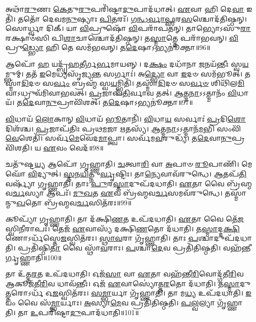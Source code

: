 𑌅𑌥𑌾᳴\-\ul{𑌰𑍁}\-𑌣𑌃 \ul{𑌕𑍇}\-𑌤𑍁\-\ul{𑌰𑍁}\-𑌪𑌰𑌿᳴𑌷𑍍𑌟𑌾\-\ul{𑌦𑍁}\-𑌪𑌾𑌦᳴𑌧𑌾𑌤𑍍। \ul{𑌏}\-𑌵𑌾 𑌹𑌿 𑌦𑍇\-\ul{𑌵𑌾} 𑌇𑌤𑌿᳴। 
𑌤𑌤𑍋᳴ 𑌦𑍇𑌵𑌮\-\ul{𑌨𑍁}\-𑌷𑍍𑌯𑌾𑌃 \ul{𑌪𑌿}\-𑌤𑌰𑌃᳴। \ul{𑌗}\-\-\ul{𑌨𑍍𑌧}\-\-\ul{𑌰𑍍𑌵𑌾}\-\-\ul{𑌫𑍍𑌸}\-𑌰\-\ul{𑌸}\-𑌶𑍍𑌚𑍋𑌦᳴𑌤𑌿𑌷𑍍𑌠𑌨𑍍। 
𑌸𑍋𑌰𑍍𑌧𑍍𑌵𑌾 𑌦𑌿𑌕𑍍। 𑌯𑌾 \ul{𑌵𑌿}\-𑌪𑍍𑌰𑍁𑌷𑍋᳴ \ul{𑌵𑌿}\-𑌪𑌰𑌾᳴𑌪𑌤𑌨𑍍। 
𑌤𑌾𑌭𑍍𑌯𑍋𑌽𑌸𑍁᳴\-\ul{𑌰𑌾} 𑌰𑌕𑍍𑌷𑌾𑍞᳴𑌸𑌿 𑌪𑌿\-\ul{𑌶𑌾}\-𑌚𑌾𑌶𑍍𑌚𑍋𑌦᳴𑌤𑌿𑌷𑍍𑌠𑌨𑍍। 𑌤\-\ul{𑌸𑍍𑌮𑌾}\-𑌤𑍍𑌤𑍇 𑌪𑌰𑌾᳴𑌭𑌵𑌨𑍍। 
\-\ul{𑌵𑌿}\-𑌪𑍍𑌰𑍁\-\ul{𑌡𑍍𑌭𑍍𑌯𑍋} 𑌹𑌿 𑌤𑍇 𑌸𑌮᳴𑌭𑌵𑌨𑍍। 𑌤\-\ul{𑌦𑍇}\-𑌷𑌾𑌽𑌭𑍍𑌯𑌨𑍂॑𑌕𑍍𑌤𑌾॥96॥


𑌆𑌪𑍋᳴ \ul{𑌹} 𑌯𑌦𑍍𑌬𑍃᳴\-\ul{𑌹}\-𑌤𑍀𑌰𑍍𑌗\-\ul{𑌰𑍍𑌭}\-𑌮𑌾𑌯𑌨𑍍𑌨𑍍। 𑌦\-\ul{𑌕𑍍𑌷𑌂} 𑌦𑌧𑌾᳴𑌨𑌾 \ul{𑌜}\-𑌨𑌯᳴𑌨𑍍𑌤𑍀𑌃 𑌸𑍍𑌵\-\ul{𑌯}\-𑌮𑍍𑌭𑍁𑌮𑍍। 
𑌤𑌤᳴ \ul{𑌇}\-𑌮𑍇𑌧𑍍𑌯𑌸𑍃᳴𑌜𑍍𑌯\-\ul{𑌨𑍍𑌤} 𑌸𑌰𑍍𑌗𑌾𑌃॑। 𑌅\-\ul{𑌦𑍍𑌭𑍍𑌯𑍋} 𑌵𑌾 \ul{𑌇}\-𑌦𑍞 𑌸𑌮᳴𑌭𑍂𑌤𑍍। 
𑌤𑌸𑍍𑌮𑌾᳴\-\ul{𑌦𑌿}\-𑌦𑍞 𑌸\-\ul{𑌰𑍍𑌵𑌂} 𑌬𑍍𑌰𑌹𑍍𑌮᳴ 𑌸𑍍𑌵\-\ul{𑌯}\-𑌮𑍍𑌭𑍍𑌵𑌿𑌤𑌿᳴। 
𑌤𑌸𑍍𑌮𑌾᳴\-\ul{𑌦𑌿}\-𑌦𑍞 𑌸\-\ul{𑌰𑍍𑌵}\-\-\ul{𑍞} 𑌶𑌿𑌥𑌿᳴𑌲\-\ul{𑌮𑌿}\-𑌵𑌾𑌽𑌧𑍍𑌰𑍁𑌵᳴𑌮𑌿𑌵𑌾𑌭𑌵𑌤𑍍। 
\-\ul{𑌪𑍍𑌰}\-𑌜𑌾𑌪᳴\-\ul{𑌤𑌿}\-𑌰𑍍𑌵𑌾𑌵 𑌤𑌤𑍍। \ul{𑌆}\-𑌤𑍍𑌮\-\ul{𑌨𑌾}\-𑌽𑌽𑌤𑍍𑌮𑌾𑌨𑌂᳴ \ul{𑌵𑌿}\-𑌧𑌾𑌯᳴। 
𑌤\-\ul{𑌦𑍇}\-𑌵𑌾\-\ul{𑌨𑍁}\-𑌪𑍍𑌰𑌾𑌵𑌿᳴𑌶𑌤𑍍। 𑌤\-\ul{𑌦𑍇}\-𑌷𑌾𑌽𑌭𑍍𑌯𑌨𑍂॑𑌕𑍍𑌤𑌾॥97॥


\-\ul{𑌵𑌿}\-𑌧𑌾𑌯᳴ \ul{𑌲𑍋}\-𑌕𑌾𑌨𑍍‌ \ul{𑌵𑌿}\-𑌧𑌾𑌯᳴ \ul{𑌭𑍂}\-𑌤𑌾𑌨𑌿᳴। \ul{𑌵𑌿}\-𑌧𑌾\-\ul{𑌯} 𑌸𑌰𑍍𑌵𑌾𑌃॑ \ul{𑌪𑍍𑌰}\-𑌦𑌿\-\ul{𑌶𑍋} 𑌦𑌿𑌶᳴𑌶𑍍𑌚। 
\-\ul{𑌪𑍍𑌰}\-𑌜𑌾𑌪᳴𑌤𑌿𑌃 𑌪𑍍𑌰𑌥\-\ul{𑌮}\-𑌜𑌾 \ul{𑌋}\-𑌤𑌸𑍍𑌯᳴। \ul{𑌆}\-𑌤𑍍𑌮\-\ul{𑌨𑌾}\-𑌽𑌽𑌤𑍍𑌮𑌾𑌨᳴\-\ul{𑌮}\-𑌭𑌿 𑌸𑌂𑌵𑌿᳴\-\ul{𑌵𑍇}\-𑌶𑍇𑌤𑌿᳴। 
𑌸𑌰𑍍𑌵᳴\-\ul{𑌮𑍇}\-𑌵𑍇𑌦\-\ul{𑌮𑌾}\-𑌪𑍍𑌤𑍍𑌵𑌾। 𑌸𑌰𑍍𑌵᳴𑌮\-\ul{𑌵}\-𑌰𑍁𑌦𑍍𑌧𑍍𑌯᳴। 
𑌤\-\ul{𑌦𑍇}\-𑌵𑌾\-\ul{𑌨𑍁}\-𑌪𑍍𑌰𑌵𑌿᳴𑌶𑌤𑌿। 𑌯 \ul{𑌏}\-𑌵𑌂 𑌵𑍇𑌦᳴॥98॥\anuvakamend


𑌚𑌤𑍁᳴𑌷𑍍𑌟\-\ul{𑌯𑍍𑌯} 𑌆𑌪𑍋᳴ 𑌗𑍃𑌹𑍍𑌣𑌾𑌤𑌿। \ul{𑌚}\-𑌤𑍍𑌵𑌾\-\ul{𑌰𑌿} 𑌵𑌾 \ul{𑌅}\-𑌪𑌾𑍞 \ul{𑌰𑍂}\-𑌪𑌾𑌣𑌿᳴। 
𑌮𑍇𑌘𑍋᳴ \ul{𑌵𑌿}\-𑌦𑍍𑌯𑍁𑌤𑍍। \ul{𑌸𑍍𑌤}\-\-\ul{𑌨}\-\-\ul{𑌯𑌿}\-𑌤𑍍𑌨𑍁\-\ul{𑌰𑍍𑌵𑍃}\-𑌷𑍍𑌟𑌿𑌃। 𑌤𑌾\-\ul{𑌨𑍍𑌯𑍇}\-𑌵𑌾𑌵᳴𑌰𑍁𑌨𑍍𑌧𑍇। 
\-\ul{𑌆}\-𑌤𑌪᳴\-\ul{𑌤𑌿} 𑌵𑌰𑍍𑌷𑍍𑌯𑌾᳴ 𑌗𑍃𑌹𑍍𑌣𑌾𑌤𑌿। 𑌤𑌾𑌃 \ul{𑌪𑍁}\-𑌰\-\ul{𑌸𑍍𑌤𑌾}\-𑌦𑍁𑌪᳴𑌦𑌧𑌾𑌤𑌿। 
\-\ul{𑌏}\-𑌤𑌾 𑌵𑍈 𑌬𑍍𑌰᳴𑌹𑍍𑌮𑌵\-\ul{𑌰𑍍𑌚}\-𑌸𑍍𑌯𑌾 𑌆𑌪𑌃᳴। \ul{𑌮𑍁}\-\-\ul{𑌖}\-𑌤 \ul{𑌏}\-𑌵 𑌬𑍍𑌰᳴𑌹𑍍𑌮𑌵\-\ul{𑌰𑍍𑌚}\-𑌸𑌮𑌵᳴𑌰𑍁𑌨𑍍𑌧𑍇। 
𑌤𑌸𑍍𑌮𑌾॑𑌨𑍍𑌮𑍁\-\ul{𑌖}\-𑌤𑍋 𑌬𑍍𑌰᳴𑌹𑍍𑌮𑌵\-\ul{𑌰𑍍𑌚}\-𑌸𑌿𑌤᳴𑌰𑌃॥99॥


𑌕𑍂𑌪𑍍𑌯𑌾᳴ 𑌗𑍃𑌹𑍍𑌣𑌾𑌤𑌿। 𑌤𑌾 𑌦᳴𑌕𑍍𑌷𑌿\-\ul{𑌣}\-𑌤 𑌉𑌪᳴𑌦𑌧𑌾𑌤𑌿। 
\-\ul{𑌏}\-𑌤𑌾 𑌵𑍈 𑌤𑍇᳴\-\ul{𑌜}\-𑌸𑍍𑌵𑌿\-\ul{𑌨𑍀}\-𑌰𑌾𑌪𑌃᳴। 𑌤𑍇𑌜᳴ \ul{𑌏}\-𑌵𑌾𑌸𑍍𑌯᳴ 𑌦𑌕𑍍𑌷𑌿\-\ul{𑌣}\-𑌤𑍋 𑌦᳴𑌧𑌾𑌤𑌿। 
𑌤\-\ul{𑌸𑍍𑌮𑌾}\-𑌦𑍍𑌦\-\ul{𑌕𑍍𑌷𑌿}\-𑌣𑍋\-𑌽𑌰𑍍𑌧᳴𑌸𑍍𑌤𑍇\-\ul{𑌜}\-\-𑌸𑍍𑌵𑌿𑌤᳴𑌰𑌃। \ul{𑌸𑍍𑌥𑌾}\-\-\ul{𑌵}\-𑌰𑌾 𑌗𑍃᳴𑌹𑍍𑌣𑌾𑌤𑌿। 
𑌤𑌾𑌃 \ul{𑌪}\-𑌶𑍍𑌚𑌾𑌦𑍁𑌪᳴𑌦𑌧𑌾𑌤𑌿। 𑌪𑍍𑌰𑌤𑌿᳴𑌷𑍍𑌠𑌿\-\ul{𑌤𑌾} 𑌵𑍈 𑌸𑍍𑌥𑌾᳴\-\ul{𑌵}\-𑌰𑌾𑌃। 
\-\ul{𑌪}\-𑌶𑍍𑌚𑌾\-\ul{𑌦𑍇}\-𑌵 𑌪𑍍𑌰𑌤𑌿᳴𑌤𑌿𑌷𑍍𑌠𑌤𑌿। 𑌵𑌹᳴𑌨𑍍𑌤𑍀𑌰𑍍𑌗𑍃𑌹𑍍𑌣𑌾𑌤𑌿॥100॥


𑌤𑌾 𑌉᳴𑌤𑍍𑌤\-\ul{𑌰}\-𑌤 𑌉𑌪᳴𑌦𑌧𑌾𑌤𑌿। 𑌓𑌜᳴\-\ul{𑌸𑌾} 𑌵𑌾 \ul{𑌏}\-𑌤𑌾 𑌵𑌹᳴𑌨𑍍𑌤𑍀\-\ul{𑌰𑌿}\-𑌵𑍋𑌦𑍍𑌗᳴𑌤𑍀\-\ul{𑌰𑌿}\-𑌵 𑌆𑌕𑍂𑌜᳴𑌤𑍀\-\ul{𑌰𑌿}\-𑌵 𑌧𑌾𑌵᳴𑌨𑍍𑌤𑍀𑌃। 
𑌓𑌜᳴ \ul{𑌏}\-𑌵𑌾𑌸𑍍𑌯𑍋॑𑌤𑍍𑌤\-\ul{𑌰}\-𑌤𑍋 𑌦᳴𑌧𑌾𑌤𑌿। 𑌤\-\ul{𑌸𑍍𑌮𑌾}\-𑌦𑍁\-\ul{𑌤𑍍𑌤}\-𑌰𑍋𑌽𑌰𑍍𑌧᳴ 𑌓\-\ul{𑌜}\-𑌸𑍍𑌵𑌿𑌤᳴𑌰𑌃। 
\-\ul{𑌸}\-\-\ul{𑌮𑍍𑌭𑌾}\-𑌰𑍍𑌯𑌾 𑌗𑍃᳴𑌹𑍍𑌣𑌾𑌤𑌿। 𑌤𑌾 𑌮\-\ul{𑌧𑍍𑌯} 𑌉𑌪᳴𑌦𑌧𑌾𑌤𑌿। 
\-\ul{𑌇}\-𑌯𑌂 𑌵𑍈 𑌸᳴\-\ul{𑌮𑍍𑌭𑌾}\-𑌰𑍍𑌯𑌾𑌃। \ul{𑌅}\-𑌸𑍍𑌯𑌾\-\ul{𑌮𑍇}\-𑌵 𑌪𑍍𑌰𑌤𑌿᳴𑌤𑌿𑌷𑍍𑌠𑌤𑌿। 
\-\ul{𑌪}\-\-\ul{𑌲𑍍𑌵}\-𑌲𑍍𑌯𑌾 𑌗𑍃᳴𑌹𑍍𑌣𑌾𑌤𑌿। 𑌤𑌾 \ul{𑌉}\-𑌪𑌰𑌿᳴𑌷𑍍𑌟𑌾\-\ul{𑌦𑍁}\-𑌪𑌾𑌦᳴𑌧𑌾𑌤𑌿॥101॥


